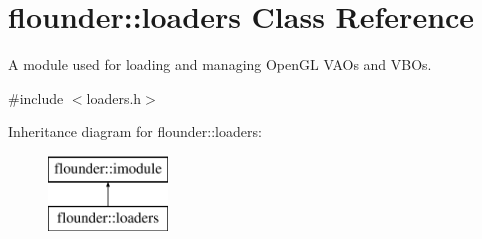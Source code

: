 \hypertarget{classflounder_1_1loaders}{}\section{flounder\+:\+:loaders Class Reference}
\label{classflounder_1_1loaders}


A module used for loading and managing Open\+GL V\+AO\textquotesingle{}s and V\+BO\textquotesingle{}s.  




{\ttfamily \#include $<$loaders.\+h$>$}

Inheritance diagram for flounder\+:\+:loaders\+:\begin{figure}[H]
\begin{center}
\leavevmode
\includegraphics[height=2.000000cm]{classflounder_1_1loaders}
\end{center}
\end{figure}
